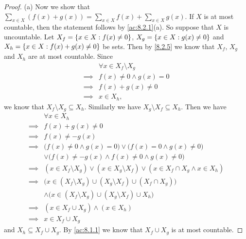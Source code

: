 \begin{proof}{(a)}
	Now we show that \(\sum_{x \in X} (f(x) + g(x)) = \sum_{x \in X} f(x) + \sum_{x \in X} g(x)\).
	If \(X\) is at most countable, then the statement follows by \cref{ac:8.2.1}(a).
	So suppose that \(X\) is uncountable.
	Let \(X_f = \left\lbrace x \in X : f(x) \neq 0\right\rbrace\), \(X_g = \left\lbrace x \in X : g(x) \neq 0\right\rbrace\) and \(X_h = \left\lbrace x \in X : f(x) + g(x) \neq 0\right\rbrace\) be sets.
	Then by \cref{8.2.5} we know that \(X_f\), \(X_g\) and \(X_h\) are at most countable.
	Since
	\begin{align*}
		         & \forall x \in X_f \setminus X_g \\
		\implies & f(x) \neq 0 \land g(x) = 0      \\
		\implies & f(x) + g(x) \neq 0              \\
		\implies & x \in X_h,
	\end{align*}
	we know that \(X_f \setminus X_g \subseteq X_h\).
	Similarly we have \(X_g \setminus X_f \subseteq X_h\).
	Then we have
	\begin{align*}
		         & \forall x \in X_h                                                                                  \\
		\implies & f(x) + g(x) \neq 0                                                                                 \\
		\implies & f(x) \neq -g(x)                                                                                    \\
		\implies & \big(f(x) \neq 0 \land g(x) = 0\big) \lor \big(f(x) = 0 \land g(x) \neq 0\big)                     \\
		         & \lor \big(f(x) \neq -g(x) \land f(x) \neq 0 \land g(x) \neq 0\big)                                 \\
		\implies & (x \in X_f \setminus X_g) \lor (x \in X_g \setminus X_f) \lor (x \in X_f \cap X_g \land x \in X_h) \\
		\implies & \big(x \in (X_f \setminus X_g) \cup (X_g \setminus X_f) \cup (X_f \cap X_g)\big)                   \\
		         & \land \big(x \in (X_f \setminus X_g) \cup (X_g \setminus X_f) \cup X_h\big)                        \\
		\implies & (x \in X_f \cup X_g) \land (x \in X_h)                                                             \\
		\implies & x \in X_f \cup X_g
	\end{align*}
	and \(X_h \subseteq X_f \cup X_g\).
	By \cref{ac:8.1.1} we know that \(X_f \cup X_g\) is at most countable.

\end{proof}
